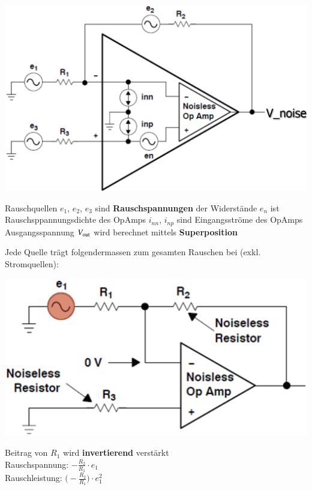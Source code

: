\begin{minipage}[c]{0.4\columnwidth}
    \includegraphics[width=\columnwidth]{images/rauschen_opamp.png}
\end{minipage}
\hfill
\begin{minipage}[c]{0.58\columnwidth}
    \begin{outline}
         Rauschquellen 
            \2 $e_1$, $e_2$, $e_3$ sind \textbf{Rauschspannungen} der Widerstände
            \2 $e_n$ ist Rauschsppannungsdichte des OpAmps
            \2 $i_{nn}$, $i_{np}$ sind Eingangsströme des OpAmps
        \1 Ausgangsspannung $V_{\rm out}$ wird berechnet mittels \textbf{Superposition}
    \end{outline}
\end{minipage}


Jede Quelle trägt folgendermassen zum gesamten Rauschen bei (exkl. Stromquellen):

\begin{minipage}[c]{0.4\columnwidth}
    \includegraphics[width=\columnwidth]{images/rauschen_opamp_R1.png}
\end{minipage}
\hfill
\begin{minipage}[c]{0.4\columnwidth}
    Beitrag von $R_1$ wird \textbf{invertierend} verstärkt \\

    Rauschspannung: $ - \frac{R_2}{R_1} \cdot e_1$ \\
    Rauschleistung: $ \bigl(- \frac{R_2}{R_1} \bigr) \cdot e_1^2$
\end{minipage}


